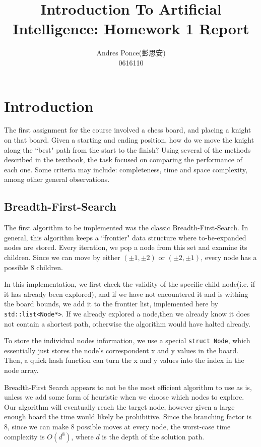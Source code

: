 \documentclass{article}
\title{Introduction To Artificial Intelligence: Homework 1 Report}
\author{Andres Ponce(彭思安)\\
0616110}
\begin{document}
\maketitle
\section{Introduction}
	The first assignment for the course involved a chess board, and placing a knight 
	on that board. Given a starting and ending position, how do we move the knight
	along the ``best" path from the start to the finish? Using several of the methods
	described in the textbook, the task focused on comparing the performance of each one.
	Some criteria may include: completeness, time and space complexity, among other general
	observations.
\subsection{Breadth-First-Search}
	The first algorithm to be implemented was the classic Breadth-First-Search. In general,
	this algorithm keeps a ``frontier" data structure where to-be-expanded nodes are stored.
	Every iteration, we pop a node from this set and examine its children. Since we can move 
	by either $(\pm1 , \pm2)$ or $(\pm2, \pm1)$, every node has a possible 8 children.

	In this implementation, we first check the validity of the specific child node(i.e. if it 
	has already been explored), and if we have not encountered it and is withing the board bounds, 
	we add it to the frontier list, implemented here by \texttt{std::list<Node*>}. If we already explored
	a node,then we already know it does not contain a shortest path, otherwise the algorithm would have
	halted already. 

	To store the individual nodes information, we use a special \texttt{struct Node}, 
	which essentially just stores the node's correspondent x and y values in the board. Then, a quick 
	hash function can turn the x and y values into the index in the node array.

	Breadth-First Search appears to not be the most efficient algorithm to use as is, unless we add
	some form of heuristic when we choose which nodes to explore. Our algorithm will eventually reach 
	the target node, however given a large enough board the time would likely be prohibitive. Since the
	branching factor is 8, since we can make 8 possible moves at every node, the worst-case time complexity
	is $O(d^{8})$, where $d$ is the depth of the solution path.
\end{document}
